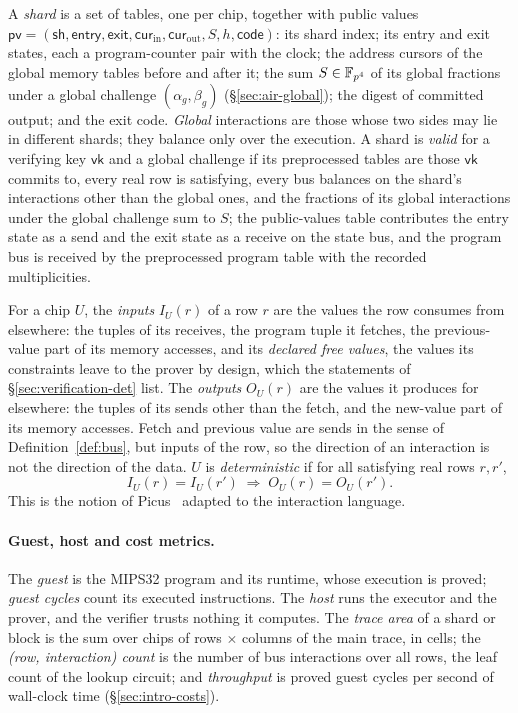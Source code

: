 \begin{definition}
\label{def:shard}
A \emph{shard} is a set of tables, one per chip, together with public values $\mathsf{pv} = (\mathsf{sh}, \mathsf{entry}, \mathsf{exit}, \mathsf{cur}_{\mathrm{in}}, \mathsf{cur}_{\mathrm{out}}, S, h, \mathsf{code})$: its shard index; its entry and exit states, each a program-counter pair with the clock; the address cursors of the global memory tables before and after it; the sum $S \in \mathbb{F}_{p^4}$ of its global fractions under a global challenge $(\alpha_g, \beta_g)$ (\S\ref{sec:air-global}); the digest of committed output; and the exit code. \emph{Global} interactions are those whose two sides may lie in different shards; they balance only over the execution. A shard is \emph{valid} for a verifying key $\mathsf{vk}$ and a global challenge if its preprocessed tables are those $\mathsf{vk}$ commits to, every real row is satisfying, every bus balances on the shard's interactions other than the global ones, and the fractions of its global interactions under the global challenge sum to $S$; the public-values table contributes the entry state as a send and the exit state as a receive on the state bus, and the program bus is received by the preprocessed program table with the recorded multiplicities.
\end{definition}

\begin{definition}
\label{def:det}
For a chip $U$, the \emph{inputs} $I_U(r)$ of a row $r$ are the values the row consumes from elsewhere: the tuples of its receives, the program tuple it fetches, the previous-value part of its memory accesses, and its \emph{declared free values}, the values its constraints leave to the prover by design, which the statements of \S\ref{sec:verification-det} list. The \emph{outputs} $O_U(r)$ are the values it produces for elsewhere: the tuples of its sends other than the fetch, and the new-value part of its memory accesses. Fetch and previous value are sends in the sense of Definition~\ref{def:bus}, but inputs of the row, so the direction of an interaction is not the direction of the data. $U$ is \emph{deterministic} if for all satisfying real rows $r, r'$,
\[
  I_U(r) = I_U(r') \;\Rightarrow\; O_U(r) = O_U(r').
\]
This is the notion of Picus~\citep{picus} adapted to the interaction language.
\end{definition}

\paragraph{Guest, host and cost metrics.} The \emph{guest} is the MIPS32 program and its runtime, whose execution is proved; \emph{guest cycles} count its executed instructions. The \emph{host} runs the executor and the prover, and the verifier trusts nothing it computes. The \emph{trace area} of a shard or block is the sum over chips of rows $\times$ columns of the main trace, in cells; the \emph{(row, interaction) count} is the number of bus interactions over all rows, the leaf count of the lookup circuit; and \emph{throughput} is proved guest cycles per second of wall-clock time (\S\ref{sec:intro-costs}).
